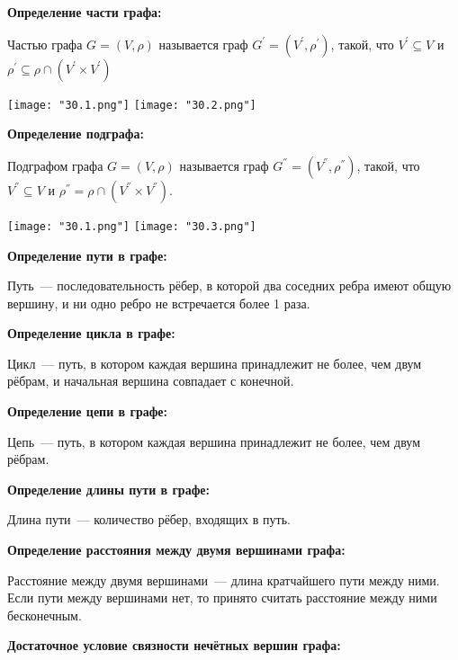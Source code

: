 \textbf{Определение части графа:}
    \smallskip

    Частью графа $G = (V, \rho)$ называется граф $G^{'} = (V^{'}, \rho^{'})$, такой,
    что $V^{'} \subseteq V$ и $\rho^{'} \subseteq \rho \cap (V^{'} \times V^{'})$
    \bigskip

    \begin{center}
        \texttt{[image: "30.1.png"]}
        \texttt{[image: "30.2.png"]}
    \end{center}

    \bigskip

\textbf{Определение подграфа:}
    \smallskip
    
    Подграфом графа $G = (V, \rho)$ называется граф $G^{''} = (V^{''}, \rho^{''})$, 
    такой, что $V^{''} \subseteq V$ и $\rho^{''} = \rho \cap (V^{''} \times V^{''})$.
    \bigskip

    \begin{center}
        \texttt{[image: "30.1.png"]}
        \texttt{[image: "30.3.png"]}
    \end{center}
    \bigskip

\textbf{Определение пути в графе:}
    \smallskip
    
    Путь~--- последовательность рёбер, в которой два соседних ребра имеют
    общую вершину, и ни одно ребро не встречается более 1 раза.
    \bigskip

\textbf{Определение цикла в графе:}
    \smallskip
    
    Цикл~--- путь, в котором каждая вершина принадлежит не более, чем двум
    рёбрам, и начальная вершина совпадает с конечной.
    \bigskip

\textbf{Определение цепи в графе:}
    \smallskip
    
    Цепь~--- путь, в котором каждая вершина принадлежит не более, чем двум рёбрам.
    \bigskip

\textbf{Определение длины пути в графе:}    
    \smallskip

    Длина пути~--- количество рёбер, входящих в путь.
    \bigskip

\textbf{Определение расстояния между двумя вершинами графа:}
    \smallskip
    
    Расстояние между двумя вершинами~--- длина кратчайшего пути между ними. Если
    пути между вершинами нет, то принято считать расстояние между ними бесконечным.
    \bigskip

\textbf{Достаточное условие связности нечётных вершин графа:}
    \smallskip
    
